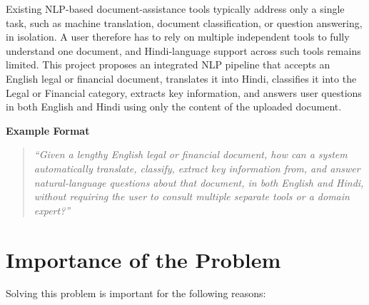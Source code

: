 Existing NLP-based document-assistance tools typically address only a single task, such as machine translation, document classification, or question answering, in isolation. A user therefore has to rely on multiple independent tools to fully understand one document, and Hindi-language support across such tools remains limited. This project proposes an integrated NLP pipeline that accepts an English legal or financial document, translates it into Hindi, classifies it into the Legal or Financial category, extracts key information, and answers user questions in both English and Hindi using only the content of the uploaded document.

\textbf{Example Format}

\begin{quote}
\textit{``Given a lengthy English legal or financial document, how can a system automatically translate, classify, extract key information from, and answer natural-language questions about that document, in both English and Hindi, without requiring the user to consult multiple separate tools or a domain expert?''}
\end{quote}


\section{Importance of the Problem}

Solving this problem is important for the following reasons:

